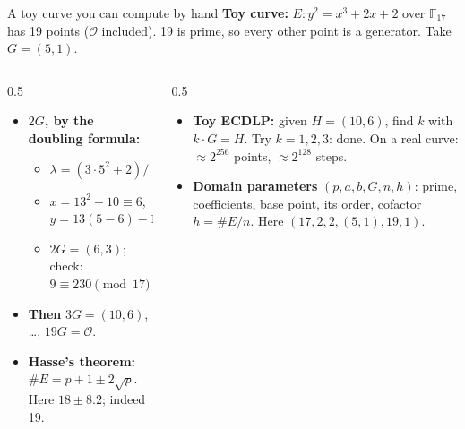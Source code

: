 \ifdefined\PRESENTATION\else\PassOptionsToClass{handout}{beamer}\fi\documentclass[aspectratio=169, lualatex]{beamer}
\begin{document}
\begin{frame}{A toy curve you can compute by hand}
	\textbf{Toy curve:} $E: y^2 = x^3 + 2x + 2$ over $\mathbb{F}_{17}$ has 19 points ($\mathcal{O}$ included). 19 is prime, so every other point is a generator. Take $G = (5, 1)$.
	\begin{columns}[t]
		\begin{column}{0.5\textwidth}
			\begin{itemize}
				\item \textbf{$2G$, by the doubling formula:}
				      \begin{itemize}
					      \item $\lambda = (3 \cdot 5^2 + 2) / (2 \cdot 1) \equiv 9 / 2 \equiv 9 \cdot 9 \equiv 13$
					      \item $x = 13^2 - 10 \equiv 6$, \quad $y = 13(5 - 6) - 1 \equiv 3$
					      \item $2G = (6, 3)$; check: $9 \equiv 230 \pmod{17}$ \mycheckmark
				      \end{itemize}
				\item \textbf{Then} $3G = (10, 6)$, \ldots, $19G = \mathcal{O}$.
				\item \textbf{Hasse's theorem:} $\#E = p + 1 \pm 2\sqrt{p}$. Here $18 \pm 8.2$; indeed 19.
			\end{itemize}
		\end{column}
		\begin{column}{0.5\textwidth}
			\begin{itemize}
				\item \textbf{Toy ECDLP:} given $H = (10, 6)$, find $k$ with $k \cdot G = H$. Try $k = 1, 2, 3$: done. On a real curve: $\approx 2^{256}$ points, $\approx 2^{128}$ steps.
				\item \textbf{Domain parameters} $(p, a, b, G, n, h)$: prime, coefficients, base point, its order, cofactor $h = \#E/n$. Here $(17, 2, 2, (5,1), 19, 1)$.
			\end{itemize}
		\end{column}
	\end{columns}
\end{frame}
\end{document}
